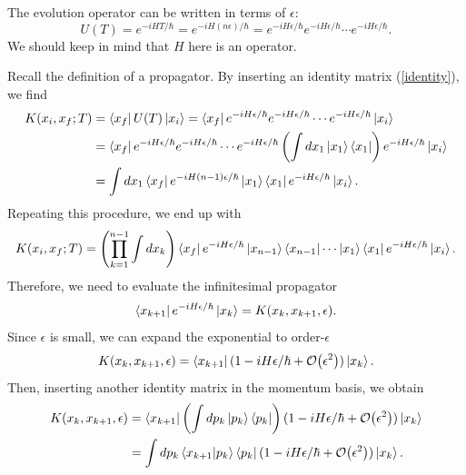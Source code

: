 \documentclass[12pt,a4paper]{article}
\begin{document}
The evolution operator can be written in terms of $\epsilon$:
\begin{equation}
    U(T) = e^{-iHT/\hbar} = e^{-iH(n\epsilon)/\hbar} = e^{-iH\epsilon/\hbar} e^{-iH\epsilon/\hbar} \cdots e^{-iH\epsilon/\hbar}. 
\end{equation}
We should keep in mind that $H$ here is an operator.

Recall the definition of a propagator. By inserting an identity matrix (\ref{identity}), we find
\begin{equation}
\begin{aligned}
    K(x_i,x_f;T) &= \bra{x_f}U(T)\ket{x_i}  = \bra{x_f}e^{-iH\epsilon/\hbar} e^{-iH\epsilon/\hbar} \cdots e^{-iH\epsilon/\hbar}\ket{x_i}\\
    &=\bra{x_f}e^{-iH\epsilon/\hbar}e^{-iH\epsilon/\hbar}\cdots e^{-iH\epsilon/\hbar}\left(\int dx_1\ket{x_1}\bra{x_1}\right)e^{-iH\epsilon/\hbar}\ket{x_i}\\
    &=\int dx_1\bra{x_f}e^{-iH(n-1)\epsilon/\hbar}\ket{x_1}\bra{x_1}e^{-iH\epsilon/\hbar}\ket{x_i}.
\end{aligned}
\end{equation}
Repeating this procedure, we end up with
\begin{equation}
    K(x_i,x_f;T) = \left(\prod_{k=1}^{n-1}\int dx_k\right)\bra{x_f}e^{-iH\epsilon/\hbar}\ket{x_{n-1}}\bra{x_{n-1}}\cdots\ket{x_1}\bra{x_1}e^{-iH\epsilon/\hbar}\ket{x_i}.
    \label{eq}
\end{equation}
Therefore, we need to evaluate the infinitesimal propagator
\begin{equation}
    \bra{x_{k+1}}e^{-iH\epsilon/\hbar}\ket{x_{k}} = K(x_{k},x_{k+1},\epsilon).
\end{equation}
Since $\epsilon$ is small, we can expand the exponential to order-$\epsilon$
\begin{equation}
    K(x_{k},x_{k+1},\epsilon) = \bra{x_{k+1}}(1-iH\epsilon/\hbar + \order{\epsilon^2})\ket{x_{k}}.
\end{equation}
Then, inserting another identity matrix in the momentum basis, we obtain
\begin{equation}
\begin{aligned}
        K(x_{k},x_{k+1},\epsilon) &= \bra{x_{k+1}}\left(\int dp_k \ket{p_k}\bra{p_k}\right)(1-iH\epsilon/\hbar + \order{\epsilon^2})\ket{x_{k}} \\
        &= \int dp_k \braket{x_{k+1}}{p_k}\bra{p_k}(1-iH\epsilon/\hbar + \order{\epsilon^2})\ket{x_{k}}.
        \label{k}
\end{aligned}
\end{equation}
\end{document}
